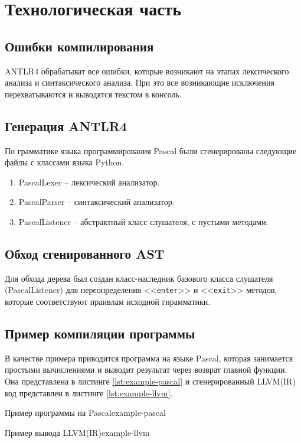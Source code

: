 \chapter{Технологическая часть}

\section{Ошибки компилирования}

ANTLR4 обрабатыват все ошибки, которые возникают на этапах лексического анализа и синтаксического анализа. При это все возникающие исключения перехватываются и выводятся текстом в консоль.


\section{Генерация ANTLR4}

По грамматике языка программирования Pascal были сгенерированы следующие файлы с классами языка Python.

\begin{enumerate}
	\item PascalLexer -- лексический анализатор.
	\item PascalParser -- синтаксический анализатор.
	\item PascalListener -- абстрактный класс слушателя, с пустыми методами.
\end{enumerate}


\section{Обход сгенированного AST}

Для обхода дерева был создан класс-наследник базового класса слушателя (PascalListener) для переопределения <<\texttt{enter}>> и <<\texttt{exit}>> методов, которые соответствуют праивлам исходной гнрамматики.


\section{Пример компиляции программы}

В качестве примера приводится программа на языке Pascal, которая занимается простыми вычислениями и выводит результат через возврат главной функции. Она представлена в листинге \ref{lst:example-pascal} и сгенерированный LLVM(IR) код представлен в листинге \ref{lst:example-llvm}.

	{}{Пример программы на Pascal}{example-pascal}{}

	{}{Пример вывода LLVM(IR)}{example-llvm}{}
